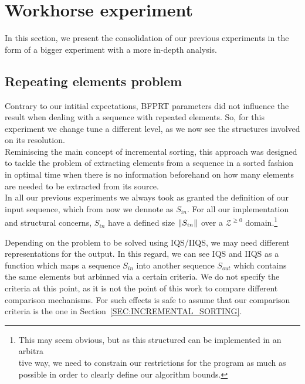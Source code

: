\chapter{Workhorse experiment}
\label{CHAPTER:WORKHORSE_EXPERIMENT}

In this section, we present the consolidation of our previous experiments in the form of a bigger experiment with a more in-depth analysis.\\

\section{Repeating elements problem}
\label{SECTION:STACK_STRUCTURE}

Contrary to our intitial expectations, BFPRT parameters did not influence the result when dealing with a sequence with repeated elements. So, for this experiment we change tune a different level, as we now see the structures involved on its resolution.\\

Reminiscing the main concept of incremental sorting, this approach was designed to tackle the problem of extracting elements from a sequence in a sorted fashion in optimal time when there is no information beforehand on how many elements are needed to be extracted from its source.\\

In all our previous experiments we always took as granted the definition of our input sequence, which from now we dennote as $S_{in}$. For all our implementation and structural concerns, $S_{in}$  have a defined size $\lVert S_{in}\rVert$ over a $\mathcal{Z}^{\geq0}$ domain.\footnote{This may seem obvious, but as this structured can be implemented in an arbitra\\tive way, we need to constrain our restrictions for the program as much as possible in order to clearly define our algorithm bounds.} 

Depending on the problem to be solved using IQS/IIQS, we may need different representations for the output. In this regard, we can see IQS and IIQS as a function which maps a sequence $S_{in}$ into another sequence $S_{out}$ which contains the same elements but arbinned via a certain criteria. We do not specify the criteria at this point, as it is not the point of this work to compare different comparison mechanisms. For such effects is safe to assume that our comparison criteria is the one in Section~\ref{SEC:INCREMENTAL_SORTING}.\\

